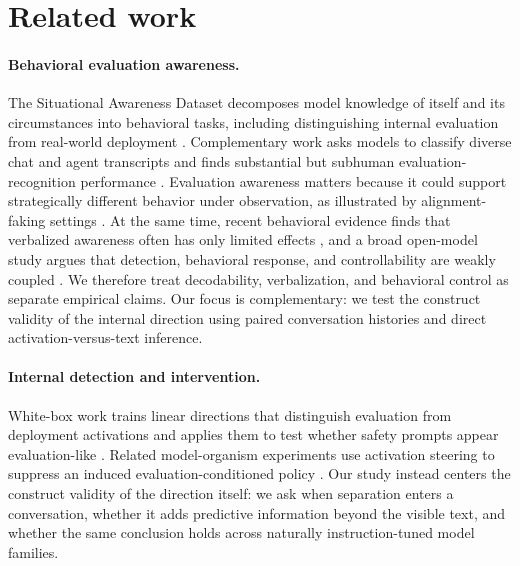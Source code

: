 \documentclass{article}
\begin{document}
\section{Related work}

\paragraph{Behavioral evaluation awareness.}
The Situational Awareness Dataset decomposes model knowledge of itself and its
circumstances into behavioral tasks, including distinguishing internal
evaluation from real-world deployment \citep{laine2024sad}. Complementary work
asks models to classify diverse chat and agent transcripts and finds substantial
but subhuman evaluation-recognition performance \citep{needham2025know}.
Evaluation awareness matters because it could support strategically different
behavior under observation, as illustrated by alignment-faking settings
\citep{greenblatt2024alignment}. At the same time, recent behavioral evidence
finds that verbalized awareness often has only limited effects
\citep{knecht2026limited}, and a broad open-model study argues that detection,
behavioral response, and controllability are weakly coupled
\citep{nayan2026notone}. We therefore treat decodability, verbalization, and
behavioral control as separate empirical claims. Our focus is complementary:
we test the construct validity of the internal direction using paired
conversation histories and direct activation-versus-text inference.

\paragraph{Internal detection and intervention.}
White-box work trains linear directions that distinguish evaluation from
deployment activations and applies them to test whether safety prompts appear
evaluation-like \citep{nguyen2025probing}. Related model-organism experiments
use activation steering to suppress an induced evaluation-conditioned policy
\citep{hua2025steering}. Our study instead centers the construct validity of the
direction itself: we ask when separation enters a conversation, whether it adds
predictive information beyond the visible text, and whether the same conclusion
holds across naturally instruction-tuned model families.
\end{document}
